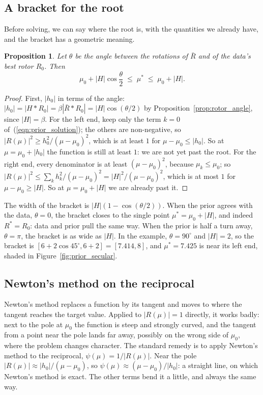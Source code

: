 \documentclass{birkjour}
\newtheorem{prop}[thm]{Proposition}
\theoremstyle{definition}
\theoremstyle{remark}
\numberwithin{equation}{section}
\begin{document}
\subsection{A bracket for the root}

Before solving, we can say where the root is, with the quantities we already have, and the bracket has a geometric meaning.
\begin{prop}
\label{prop:prior_bracket}
Let $\theta$ be the angle between the rotations of $\bar R$ and of the data's best rotor $R_0$. Then
\begin{equation}
\label{eqn:prior_bracket}
\mu_0 + |H| \cos\frac{\theta}{2} \;\leq\; \mu^* \;\leq\; \mu_0 + |H| .
\end{equation}
\end{prop}
\begin{proof}
First, $|h_0|$ in terms of the angle: $|h_0| = |H * R_0| = \beta |\bar R * R_0| = |H| \cos(\theta / 2)$ by Proposition~\ref{prop:rotor_angle}, since $|H| = \beta$. For the left end, keep only the term $k = 0$ of~(\ref{eqn:prior_solution}); the others are non-negative, so $|R(\mu)|^2 \geq h_0^2 / (\mu - \mu_0)^2$, which is at least $1$ for $\mu - \mu_0 \leq |h_0|$. So at $\mu = \mu_0 + |h_0|$ the function is still at least $1$: we are not yet past the root. For the right end, every denominator is at least $(\mu - \mu_0)^2$, because $\mu_k \leq \mu_0$; so $|R(\mu)|^2 \leq \sum_k h_k^2 / (\mu - \mu_0)^2 = |H|^2 / (\mu - \mu_0)^2$, which is at most $1$ for $\mu - \mu_0 \geq |H|$. So at $\mu = \mu_0 + |H|$ we are already past it.
\end{proof}
The width of the bracket is $|H| (1 - \cos(\theta/2))$. When the prior agrees with the data, $\theta = 0$, the bracket closes to the single point $\mu^* = \mu_0 + |H|$, and indeed $R^* = R_0$: data and prior pull the same way. When the prior is half a turn away, $\theta = \pi$, the bracket is as wide as $|H|$. In the example, $\theta = 90^\circ$ and $|H| = 2$, so the bracket is $[6 + 2 \cos 45^\circ, 6 + 2] = [7.414, 8]$, and $\mu^* = 7.425$ is near its left end, shaded in Figure~\ref{fig:prior_secular}.

\subsection{Newton's method on the reciprocal}

Newton's method replaces a function by its tangent and moves to where the tangent reaches the target value. Applied to $|R(\mu)| = 1$ directly, it works badly: next to the pole at $\mu_0$ the function is steep and strongly curved, and the tangent from a point near the pole lands far away, possibly on the wrong side of $\mu_0$, where the problem changes character. The standard remedy \cite{MoreSorensen1983} is to apply Newton's method to the reciprocal, $\psi(\mu) = 1 / |R(\mu)|$. Near the pole $|R(\mu)| \approx |h_0| / (\mu - \mu_0)$, so $\psi(\mu) \approx (\mu - \mu_0) / |h_0|$: a straight line, on which Newton's method is exact. The other terms bend it a little, and always the same way.
\end{document}
